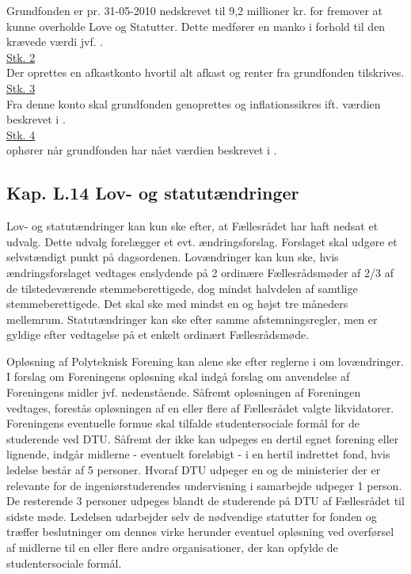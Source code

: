 \begin{list}
\item \label{L:Grundfond:9.2mio} Grundfonden er pr. 31-05-2010 nedskrevet til 9,2 millioner kr. for fremover at kunne overholde Love og Statutter. Dette medfører en manko i forhold til den krævede værdi jvf. .\\

\underline{Stk. 2}\\
Der oprettes en afkastkonto hvortil alt afkast og renter fra grundfonden tilskrives.\\

\underline{Stk. 3}\\
Fra denne konto skal grundfonden genoprettes og inflationssikres ift. værdien beskrevet i .\\


\underline{Stk. 4}\\
 ophører når grundfonden har nået værdien beskrevet i .
\subsection*{Kap. L.14 Lov- og statutændringer}
\item \label{L:LS:aendringer} Lov- og statutændringer kan kun ske efter, at Fællesrådet har haft nedsat et udvalg. Dette udvalg forelægger et evt. ændringsforslag. Forslaget skal udgøre et selvstændigt punkt på dagsordenen. Lovændringer kan kun ske, hvis ændringsforslaget vedtages enslydende på 2 ordinære Fællesrådsmøder af 2/3 af de tilstedeværende stemmeberettigede, dog mindst halvdelen af samtlige stemmeberettigede. Det skal ske med mindst en og højst tre måneders mellemrum. Statutændringer kan ske efter samme afstemningsregler, men er gyldige efter vedtagelse på et enkelt ordinært Fællesrådsmøde.

\item Opløsning af Polyteknisk Forening kan alene ske efter reglerne i  om lovændringer. I forslag om Foreningens opløsning skal indgå forslag om anvendelse af Foreningens midler jvf. nedenstående. Såfremt opløsningen af Foreningen vedtages, forestås opløsningen af en eller flere af Fællesrådet valgte likvidatorer. Foreningens eventuelle formue skal tilfalde studentersociale formål for de studerende ved DTU. Såfremt der ikke kan udpeges en dertil egnet forening eller lignende, indgår midlerne - eventuelt foreløbigt - i en hertil indrettet fond, hvis ledelse består af 5 personer. Hvoraf DTU udpeger en og de ministerier der er relevante for de ingeniørstuderendes undervisning i samarbejde udpeger 1 person. De resterende 3 personer udpeges blandt de studerende på DTU af Fællesrådet til sidste møde. Ledelsen udarbejder selv de nødvendige statutter for fonden og træffer beslutninger om dennes virke herunder eventuel opløsning ved overførsel af midlerne til en eller flere andre organisationer, der kan opfylde de studentersociale formål.

\end{list}
